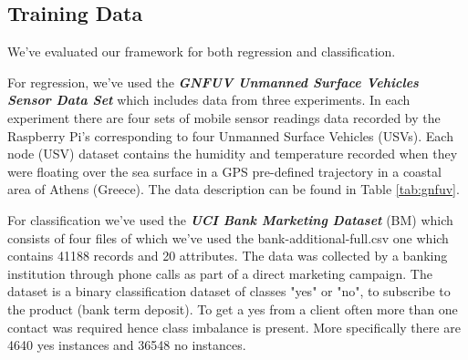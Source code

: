 \documentclass{mpaper}
\begin{document}
\subsection{Training Data}\label{chap:training_data}

We've evaluated our framework for both regression and classification. 


For regression, we've used the \textbf{\textit{GNFUV Unmanned Surface Vehicles Sensor Data Set}} \cite{GNFUV} which includes data from three experiments. In each experiment there are four sets of mobile sensor readings data recorded by the Raspberry Pi's corresponding to four Unmanned Surface Vehicles (USVs). Each node (USV) dataset contains the humidity and temperature recorded when they were floating over the sea surface in a GPS pre-defined trajectory in a coastal area of Athens (Greece). The data description can be found in Table \ref{tab:gnfuv}. 

For classification we've used the \textbf{\textit{UCI Bank Marketing Dataset}} (BM) \cite{BMDataset} which consists of four files of which we've used the bank-additional-full.csv one which contains 41188 records and 20 attributes. The data was collected by a banking institution through phone calls as part of a direct marketing campaign. The dataset is a binary classification dataset of classes "yes" or "no", to subscribe to the product (bank term deposit). To get a yes from a client often more than one contact was required hence class imbalance is present. More specifically there are 4640 yes instances and 36548 no instances. 
\end{document}
